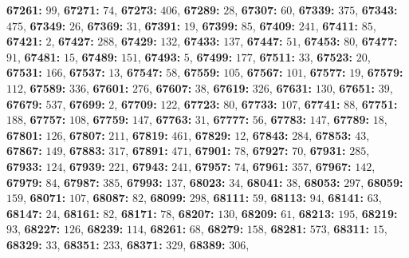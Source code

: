 \textsf{\bfseries 67261:} $99$, \textsf{\bfseries 67271:} $74$, \textsf{\bfseries 67273:} $406$, \textsf{\bfseries 67289:} $28$, \textsf{\bfseries 67307:} $60$, \textsf{\bfseries 67339:} $375$, \textsf{\bfseries 67343:} $475$, \textsf{\bfseries 67349:} $26$, \textsf{\bfseries 67369:} $31$, \textsf{\bfseries 67391:} $19$, \textsf{\bfseries 67399:} $85$, \textsf{\bfseries 67409:} $241$, \textsf{\bfseries 67411:} $85$, \textsf{\bfseries 67421:} $2$, \textsf{\bfseries 67427:} $288$, \textsf{\bfseries 67429:} $132$, \textsf{\bfseries 67433:} $137$, \textsf{\bfseries 67447:} $51$, \textsf{\bfseries 67453:} $80$, \textsf{\bfseries 67477:} $91$, \textsf{\bfseries 67481:} $15$, \textsf{\bfseries 67489:} $151$, \textsf{\bfseries 67493:} $5$, \textsf{\bfseries 67499:} $177$, \textsf{\bfseries 67511:} $33$, \textsf{\bfseries 67523:} $20$, \textsf{\bfseries 67531:} $166$, \textsf{\bfseries 67537:} $13$, \textsf{\bfseries 67547:} $58$, \textsf{\bfseries 67559:} $105$, \textsf{\bfseries 67567:} $101$, \textsf{\bfseries 67577:} $19$, \textsf{\bfseries 67579:} $112$, \textsf{\bfseries 67589:} $336$, \textsf{\bfseries 67601:} $276$, \textsf{\bfseries 67607:} $38$, \textsf{\bfseries 67619:} $326$, \textsf{\bfseries 67631:} $130$, \textsf{\bfseries 67651:} $39$, \textsf{\bfseries 67679:} $537$, \textsf{\bfseries 67699:} $2$, \textsf{\bfseries 67709:} $122$, \textsf{\bfseries 67723:} $80$, \textsf{\bfseries 67733:} $107$, \textsf{\bfseries 67741:} $88$, \textsf{\bfseries 67751:} $188$, \textsf{\bfseries 67757:} $108$, \textsf{\bfseries 67759:} $147$, \textsf{\bfseries 67763:} $31$, \textsf{\bfseries 67777:} $56$, \textsf{\bfseries 67783:} $147$, \textsf{\bfseries 67789:} $18$, \textsf{\bfseries 67801:} $126$, \textsf{\bfseries 67807:} $211$, \textsf{\bfseries 67819:} $461$, \textsf{\bfseries 67829:} $12$, \textsf{\bfseries 67843:} $284$, \textsf{\bfseries 67853:} $43$, \textsf{\bfseries 67867:} $149$, \textsf{\bfseries 67883:} $317$, \textsf{\bfseries 67891:} $471$, \textsf{\bfseries 67901:} $78$, \textsf{\bfseries 67927:} $70$, \textsf{\bfseries 67931:} $285$, \textsf{\bfseries 67933:} $124$, \textsf{\bfseries 67939:} $221$, \textsf{\bfseries 67943:} $241$, \textsf{\bfseries 67957:} $74$, \textsf{\bfseries 67961:} $357$, \textsf{\bfseries 67967:} $142$, \textsf{\bfseries 67979:} $84$, \textsf{\bfseries 67987:} $385$, \textsf{\bfseries 67993:} $137$, \textsf{\bfseries 68023:} $34$, \textsf{\bfseries 68041:} $38$, \textsf{\bfseries 68053:} $297$, \textsf{\bfseries 68059:} $159$, \textsf{\bfseries 68071:} $107$, \textsf{\bfseries 68087:} $82$, \textsf{\bfseries 68099:} $298$, \textsf{\bfseries 68111:} $59$, \textsf{\bfseries 68113:} $94$, \textsf{\bfseries 68141:} $63$, \textsf{\bfseries 68147:} $24$, \textsf{\bfseries 68161:} $82$, \textsf{\bfseries 68171:} $78$, \textsf{\bfseries 68207:} $130$, \textsf{\bfseries 68209:} $61$, \textsf{\bfseries 68213:} $195$, \textsf{\bfseries 68219:} $93$, \textsf{\bfseries 68227:} $126$, \textsf{\bfseries 68239:} $114$, \textsf{\bfseries 68261:} $68$, \textsf{\bfseries 68279:} $158$, \textsf{\bfseries 68281:} $573$, \textsf{\bfseries 68311:} $15$, \textsf{\bfseries 68329:} $33$, \textsf{\bfseries 68351:} $233$, \textsf{\bfseries 68371:} $329$, \textsf{\bfseries 68389:} $306$, 

